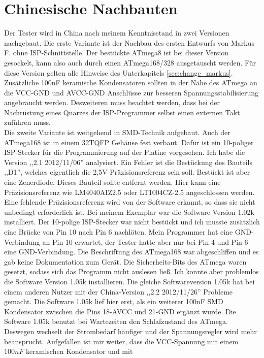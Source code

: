 \section{Chinesische Nachbauten}
Der Tester wird in China nach meinem Kenntnisstand in zwei Versionen nachgebaut.
Die erste Variante ist der Nachbau des ersten Entwurfs von Markus F. ohne ISP-Schnittstelle.
Der bestückte ATmega8 ist bei dieser Version gesockelt, kann also auch durch einen ATmega168/328 ausgetauscht werden.
Für diese Version gelten alle Hinweise des Unterkapitels \ref{sec:change_markus}.
Zusätzliche 100nF keramische Kondensatoren sollten in der Nähe des ATmega an die VCC-GND und
AVCC-GND Anschlüsse zur besseren Spannungsstabilisierung angebraucht werden.
Desweiteren muss beachtet werden, dass bei der Nachrüstung eines Quarzes der ISP-Programmer selbst
einen externen Takt zuführen muss.\\
Die zweite Variante ist weitgehend in SMD-Technik aufgebaut. Auch der ATmega168 ist in einem 32TQFP
Gehäuse fest verbaut.
Dafür ist ein 10-poliger ISP-Stecker für die Programmierung auf der Platine vorgesehen.
Ich habe die Version ,,2.1 2012/11/06'' analysiert. Ein Fehler ist die Bestückung des Bauteils ,,D1'',
welches eigentlich die 2,5V Präzisionsreferenz sein soll. Bestückt ist aber eine Zenerdiode.
Dieses Bauteil sollte entfernt werden. Hier kann eine Präzisionsreferenz wie LM4040AIZ2.5 oder
LT1004CZ-2.5 angeschlossen werden. Eine fehlende Präzisionsreferenz wird von der Software erkannt,
so dass sie nicht unbedingt erforderlich ist.
Bei meinem Exemplar war die Software Version 1.02k installiert. Der 10-polige ISP-Stecker war nicht
bestückt und ich musste zusätzlich eine Brücke von Pin 10 nach Pin 6 nachlöten. Mein Programmer hat eine 
GND-Verbindung an Pin 10 erwartet, der Tester hatte aber nur bei Pin 4 und Pin 6 eine GND-Verbindung.
Die Beschriftung des ATmega168 war abgeschliffen und es gab keine Dokumentation zum Gerät.
Die Sicherheits-Bits des ATmega waren gesetzt, sodass sich das Programm nicht auslesen ließ.
Ich konnte aber problemlos die Software Version 1.05k installieren.
Die gleiche Softwareversion 1.05k hat bei einem anderen Nutzer mit der China-Version ,,2.2 2012/11/26'' Probleme
gemacht. Die Software 1.05k lief hier erst, als ein weiterer 100nF SMD Kondensator zwischen die Pins 18-AVCC
und 21-GND ergänzt wurde. Die Software 1.05k benutzt bei Wartezeiten den Schlafzustand des ATmega.
Deswegen wechselt der Strombedarf häufiger und der Spannungsregler wird mehr beansprucht.
Aufgefallen ist mir weiter, dass die VCC-Spannung mit einem \(100nF\) keramischen Kondensator und mit
